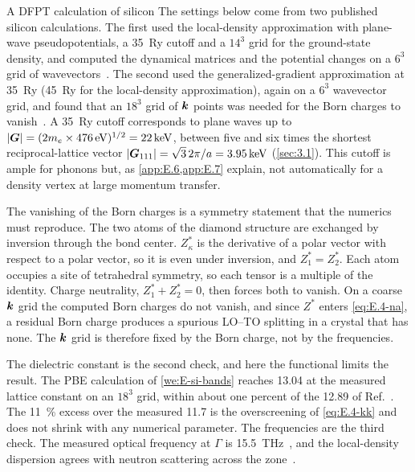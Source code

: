 \begin{workedexample}{A DFPT calculation of silicon}\label{we:E-dfpt-si}
The settings below come from two published silicon calculations. The first used the local-density approximation with plane-wave pseudopotentials, a \SI{35}{Ry} cutoff and a $14^3$ grid for the ground-state density, and computed the dynamical matrices and the potential changes on a $6^3$ grid of wavevectors~\cite{noffsinger2012phonon}. The second used the generalized-gradient approximation at \SI{35}{Ry} (\SI{45}{Ry} for the local-density approximation), again on a $6^3$ wavevector grid, and found that an $18^3$ grid of $\bm{k}$ points was needed for the Born charges to vanish~\cite{ponce2018towards}. A \SI{35}{Ry} cutoff corresponds to plane waves up to $|\bm{G}| = (2m_e\times\SI{476}{eV})^{1/2} = \SI{22}{keV}$, between five and six times the shortest reciprocal-lattice vector $|\bm{G}_{111}| = \sqrt3\,2\pi/a = \SI{3.95}{keV}$ (\cref{sec:3.1}). This cutoff is ample for phonons but, as \cref{app:E.6,app:E.7} explain, not automatically for a density vertex at large momentum transfer.

The vanishing of the Born charges is a symmetry statement that the numerics must reproduce. The two atoms of the diamond structure are exchanged by inversion through the bond center. $Z^*_\kappa$ is the derivative of a polar vector with respect to a polar vector, so it is even under inversion, and $Z^*_1 = Z^*_2$. Each atom occupies a site of tetrahedral symmetry, so each tensor is a multiple of the identity. Charge neutrality, $Z^*_1 + Z^*_2 = 0$, then forces both to vanish. On a coarse $\bm{k}$ grid the computed Born charges do not vanish, and since $Z^*$ enters \cref{eq:E.4-na}, a residual Born charge produces a spurious LO--TO splitting in a crystal that has none. The $\bm{k}$ grid is therefore fixed by the Born charge, not by the frequencies.

The dielectric constant is the second check, and here the functional limits the result. The PBE calculation of \cref{we:E-si-bands} reaches 13.04 at the measured lattice constant on an $18^3$ grid, within about one percent of the 12.89 of Ref.~\cite{ponce2018towards}. The \SI{11}{\percent} excess over the measured 11.7 is the overscreening of \cref{eq:E.4-kk} and does not shrink with any numerical parameter. The frequencies are the third check. The measured optical frequency at $\Gamma$ is \SI{15.5}{THz}~\cite{nilsson1972study}, and the local-density dispersion agrees with neutron scattering across the zone~\cite[Sect.~V.A]{baroni2001phonons}.
\end{workedexample}
